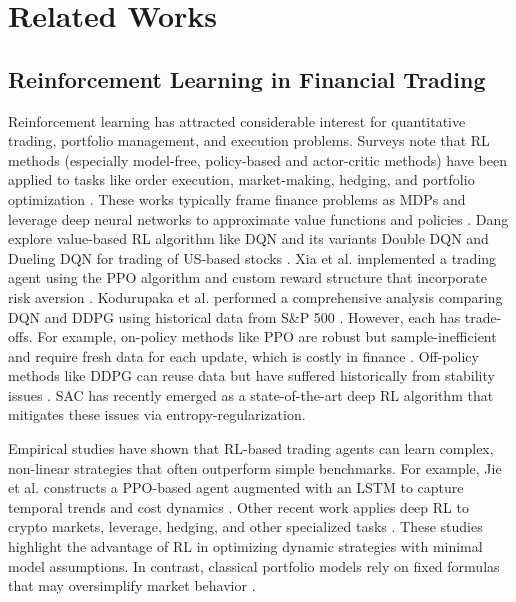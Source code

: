 \section{Related Works}
\label{sec:literature}
\subsection{Reinforcement Learning in Financial Trading}
Reinforcement learning has attracted considerable interest for quantitative trading, portfolio management, and execution problems. Surveys note that \gls{RL} methods (especially model-free, policy-based and actor-critic methods) have been applied to tasks like order execution, market-making, hedging, and portfolio optimization \cite{Hambly2023}. These works typically frame finance problems as \gls{MDP}s and leverage deep neural networks to approximate value functions and policies \cite{Kabbani2022, Xia2023, Kabbani2022}. Dang explore value-based \gls{RL} algorithm like \gls{DQN} and its variants Double \gls{DQN} and Dueling \gls{DQN} for trading of US-based stocks \cite{Dang2020}. Xia et al. implemented a trading agent using the \gls{PPO} algorithm and custom reward structure that incorporate risk aversion \cite{Xia2023}. Kodurupaka et al. performed a comprehensive analysis comparing \gls{DQN} and \gls{DDPG} using historical data from S\&P 500 \cite{Kodurupaka2024}. However, each has trade-offs. For example, on-policy methods like \gls{PPO} are robust but sample-inefficient and require fresh data for each update, which is costly in finance \cite{Haarnoja2018}. Off-policy methods like \gls{DDPG} can reuse data but have suffered historically from stability issues \cite{Haarnoja2018}. \gls{SAC} has recently emerged as a state-of-the-art deep \gls{RL} algorithm that mitigates these issues via entropy-regularization.

Empirical studies have shown that \gls{RL}-based trading agents can learn complex, non-linear strategies that often outperform simple benchmarks. For example, Jie et al. constructs a \gls{PPO}-based agent augmented with an \gls{LSTM} to capture temporal trends and cost dynamics \cite{Jie2024}. Other recent work applies deep \gls{RL} to crypto markets, leverage, hedging, and other specialized tasks \cite{Qin2024, LiuKang2024}. These studies highlight the advantage of \gls{RL} in optimizing dynamic strategies with minimal model assumptions. In contrast, classical portfolio models rely on fixed formulas that may oversimplify market behavior \cite{Hambly2023}.

